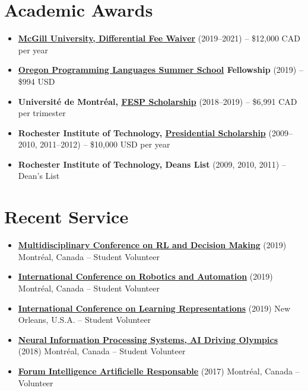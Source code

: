 \documentclass[letterpaper,11pt]{article}
\newcommand{\resumeItem}[2]{
\item\small{
\textbf{#1}{ #2 \vspace{-2pt}}
}
}
\newcommand{\resumeSubItem}[2]{\resumeItem{#1}{#2}}
\newcommand{\resumeSubHeadingListStart}{\begin{itemize}[leftmargin=*]}
\newcommand{\resumeSubHeadingListEnd}{\end{itemize}}
\begin{document}
\begin{justify}
\section{Academic Awards}
\resumeSubHeadingListStart
\resumeSubItem{\href{https://www.mcgill.ca/expmed/funding-and-awards/differential-fee-waivers}{McGill University, Differential Fee Waiver}}{(2019--2021) -- \$12,000 CAD per year}
\resumeSubItem{\href{https://www.cs.uoregon.edu/research/summerschool/summer19/}{Oregon Programming Languages Summer School} Fellowship}{(2019) -- \$994 USD}
\resumeSubItem{Universit\'e de Montr\'eal, \href{https://esp.umontreal.ca/english/what-you-need-to-know/international/scholarship/}{FESP Scholarship}}{(2018--2019) -- \$6,991 CAD per trimester}
\resumeSubItem{Rochester Institute of Technology, \href{https://www.rit.edu/admissions/aid/merit-based-scholarships}{Presidential Scholarship}}{(2009--2010, 2011--2012) -- \$10,000 USD per year}
\resumeSubItem{Rochester Institute of Technology, Deans List}{(2009, 2010, 2011) -- Dean's List}
\resumeSubHeadingListEnd

\section{Recent Service}
\resumeSubHeadingListStart
\resumeSubItem{\href{http://rldm.org/}{Multidisciplinary Conference on RL and Decision Making}}{(2019) Montr\'eal, Canada -- Student Volunteer}
\resumeSubItem{\href{https://www.icra2019.org/}{International Conference on Robotics and Automation}}{(2019)  Montr\'eal, Canada -- Student Volunteer}
\resumeSubItem{\href{https://iclr.cc/Conferences/2019}{International Conference on Learning Representations}}{(2019) New Orleans, U.S.A. -- Student Volunteer}
\resumeSubItem{\href{https://www.duckietown.org/research/ai-driving-olympics}{Neural Information Processing Systems, AI Driving Olympics}}{(2018) Montr\'eal, Canada -- Student Volunteer}
\resumeSubItem{\href{https://sites.grenadine.co/sites/forumiaresponsableumontreal/fr/forumiaresponsableumontreal}{Forum Intelligence Artificielle Responsable}}{(2017) Montr\'eal, Canada -- Volunteer}
\resumeSubHeadingListEnd


\end{justify}
\end{document}
